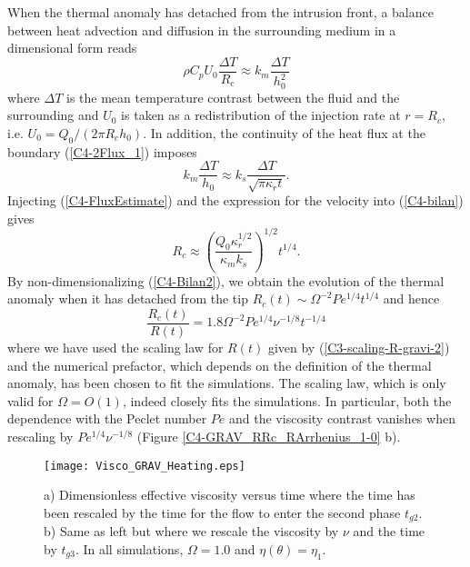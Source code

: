 When  the thermal  anomaly has  detached from  the intrusion  front, a
balance between heat advection and diffusion in the surrounding medium
in a dimensional form reads
\begin{equation}
  \rho C_p U_0 \frac{\Delta T}{R_c} \approx k_m \frac{\Delta T}{h_0^2}
  \label{C4-bilan}
\end{equation}
where $\Delta  T$ is the  mean temperature contrast between  the fluid
and the  surrounding and  $U_0$ is  taken as  a redistribution  of the
injection rate at $r=R_c$, i.e. $U_0=Q_0/(2\pi R_c h_0)$. In addition,
the continuity  of the  heat flux  at the  boundary (\ref{C4-2Flux_1})
imposes
\begin{equation}
  k_m\frac{\Delta   T}{h_0}\approx   k_s   \frac{\Delta   T}{\sqrt{\pi
      \kappa_r t}}.
  \label{C4-FluxEstimate}
\end{equation}
Injecting (\ref{C4-FluxEstimate}) and the  expression for the velocity
into (\ref{C4-bilan}) gives
\begin{equation}
  R_c \approx  \left(\frac{Q_0\kappa_r^{1/2}}{\kappa_m k_s}\right)^{1/2}
  t^{1/4}.
  \label{C4-Bilan2}
\end{equation}
By non-dimensionalizing (\ref{C4-Bilan2}), we  obtain the evolution of
the   thermal   anomaly   when   it  has   detached   from   the   tip
$R_c(t)\sim \Omega^{-2}Pe^{1/4}t^{1/4}$ and hence
\begin{equation}
  \frac{R_c(t)}{R(t)} = 1.8\Omega^{-2}Pe^{1/4}\nu^{-1/8}t^{-1/4}
  \label{C4-Rc}
\end{equation}
where   we  have   used  the   scaling   law  for   $R(t)$  given   by
(\ref{C3-scaling-R-gravi-2})  and   the  numerical   prefactor,  which
depends on the  definition of the thermal anomaly, has  been chosen to
fit  the  simulations.  The  scaling  law,  which  is only  valid  for
$\Omega = O(1)$,  indeed closely fits the  simulations. In particular,
both  the dependence  with the  Peclet number  $Pe$ and  the viscosity
contrast  vanishes  when  rescaling  by  $Pe^{1/4}\nu^{-1/8}$  (Figure
\ref{C4-GRAV_RRc_RArrhenius_1-0} b).

\begin{figure}[h!]
  \begin{center}
    \graphicspath{ {/Users/thorey/Documents/These/Projet/Refroidissement/Skin_Model/Figure/Figure_Heating/} }
    \texttt{[image: Visco\_GRAV\_Heating.eps]}
    \caption{a)  Dimensionless effective  viscosity versus  time where
      the time has been rescaled by the time for the flow to enter the
      second phase $t_{g2}$. b) Same as  left but where we rescale the
      viscosity  by   $\nu$  and  the   time  by  $t_{g3}$.    In  all
      simulations, $\Omega=1.0$ and $\eta(\theta)=\eta_1$.}
    \label{C4-Visco_GRAV_Heating}
  \end{center}
\end{figure}

